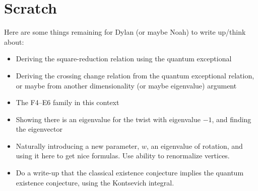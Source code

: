 \documentclass[12pt]{amsart}
\begin{document}
\section{Scratch}
Here are some things remaining for Dylan (or maybe Noah) to write
up/think about:
\begin{itemize}
\item Deriving the square-reduction relation using the quantum exceptional
\item Deriving the crossing change relation from the quantum
  exceptional relation, or maybe from another dimensionality (or
  maybe eigenvalue) argument
\item The F4--E6 family in this context
\item Showing there is an eigenvalue for the twist with eigenvalue
  $-1$, and finding the eigenvector
\item Naturally introducing a new parameter, $w$, an eigenvalue of
  rotation, and using it here to get nice formulas. Use ability to
  renormalize vertices.
\item Do a write-up that the classical existence conjecture implies
  the quantum existence conjecture, using the Kontsevich integral.
\end{itemize}
\end{document}
